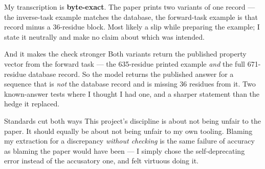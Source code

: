 \begin{center}
\end{center}

My transcription is \textbf{byte-exact}. The paper prints two variants of one
record --- the inverse-task example matches the database, the forward-task
example is that record minus a 36-residue block. Most likely a slip while
preparing the example; I state it neutrally and make no claim about which was
intended.

\begin{goodbox}{And it makes the check stronger}
Both variants return the published property vector from the forward task ---
the 635-residue printed example \emph{and} the full 671-residue database record.
So the model returns the published answer for a sequence that is \emph{not} the
database record and is missing 36 residues from it. Two known-answer tests
where I thought I had one, and a sharper statement than the hedge it replaced.
\end{goodbox}

\begin{keybox}{Standards cut both ways}
This project's discipline is about not being unfair to the paper. It should
equally be about not being unfair to my own tooling. Blaming my extraction for a
discrepancy \emph{without checking} is the same failure of accuracy as blaming
the paper would have been --- I simply chose the self-deprecating error instead
of the accusatory one, and felt virtuous doing it.
\end{keybox}

